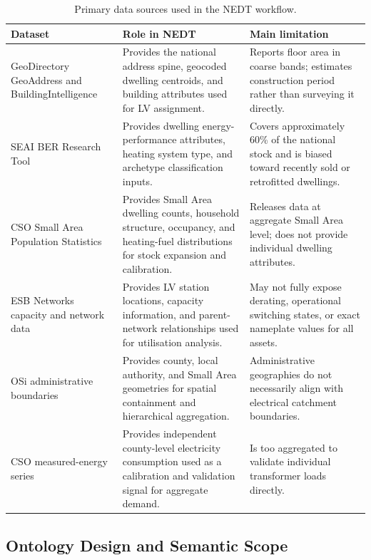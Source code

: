 \documentclass[preprint,12pt]{elsarticle}
\begin{document}
\begin{table}[H]
\centering
\caption{Primary data sources used in the NEDT workflow.}
\label{tab:data_sources}
\small
\setlength{\tabcolsep}{4pt}
\renewcommand{\arraystretch}{1.2}
\begin{tabularx}{\textwidth}{P{3.2cm}YY}
\toprule
\textbf{Dataset} & \textbf{Role in NEDT} & \textbf{Main limitation} \\
\midrule
GeoDirectory GeoAddress and BuildingIntelligence &
  Provides the national address spine, geocoded dwelling centroids, and
  building attributes used for LV assignment. &
  Reports floor area in coarse bands; estimates construction period rather
  than surveying it directly. \\
SEAI BER Research Tool &
  Provides dwelling energy-performance attributes, heating system type, and
  archetype classification inputs. &
  Covers approximately 60\% of the national stock and is biased toward
  recently sold or retrofitted dwellings. \\
CSO Small Area Population Statistics &
  Provides Small Area dwelling counts, household structure, occupancy, and
  heating-fuel distributions for stock expansion and calibration. &
  Releases data at aggregate Small Area level; does not provide individual
  dwelling attributes. \\
ESB Networks capacity and network data &
  Provides LV station locations, capacity information, and parent-network
  relationships used for utilisation analysis. &
  May not fully expose derating, operational switching states, or exact
  nameplate values for all assets. \\
OSi administrative boundaries &
  Provides county, local authority, and Small Area geometries for spatial
  containment and hierarchical aggregation. &
  Administrative geographies do not necessarily align with electrical
  catchment boundaries. \\
CSO measured-energy series &
  Provides independent county-level electricity consumption used as a
  calibration and validation signal for aggregate demand. &
  Is too aggregated to validate individual transformer loads directly. \\
\bottomrule
\end{tabularx}
\end{table}

\subsection{Ontology Design and Semantic Scope}
\label{sec:ontology-development}
\end{document}
